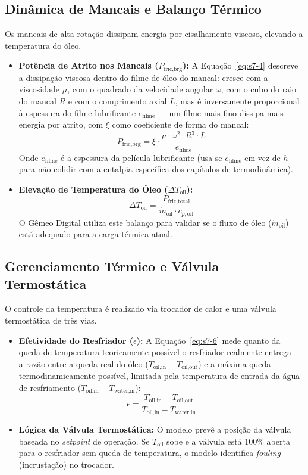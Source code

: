 \documentclass[12pt,a4paper]{article}
\numberwithin{equation}{section}
\numberwithin{table}{section}
\numberwithin{figure}{section}
\begin{document}
	\subsection{\textbf{Dinâmica de Mancais e Balanço Térmico}}
	Os mancais de alta rotação dissipam energia por cisalhamento viscoso, elevando a temperatura do óleo.
	\begin{itemize}
		\item \textbf{Potência de Atrito nos Mancais ($P_{\text{fric,brg}}$):} A Equação~\eqref{eq:s7-4} descreve a dissipação viscosa dentro do filme de óleo do mancal: cresce com a viscosidade $\mu$, com o quadrado da velocidade angular $\omega$, com o cubo do raio do mancal $R$ e com o comprimento axial $L$, mas é inversamente proporcional à espessura do filme lubrificante $e_{\text{filme}}$ — um filme mais fino dissipa mais energia por atrito, com $\xi$ como coeficiente de forma do mancal:
		\begin{equation}\label{eq:s7-4}
 P_{\text{fric,brg}} = \xi \cdot \frac{\mu \cdot \omega^2 \cdot R^3 \cdot L}{e_{\text{filme}}}
\end{equation}
		Onde $e_{\text{filme}}$ é a espessura da película lubrificante (usa-se $e_{\text{filme}}$ em vez de $h$ para não colidir com a entalpia específica dos capítulos de termodinâmica).
		\item \textbf{Elevação de Temperatura do Óleo ($\Delta T_{\text{oil}}$):}
		\begin{equation}\label{eq:s7-5}
 \Delta T_{\text{oil}} = \frac{P_{\text{fric,total}}}{\dot{m}_{\text{oil}} \cdot c_{p,\text{oil}}} 
\end{equation}
		O Gêmeo Digital utiliza este balanço para validar se o fluxo de óleo ($\dot{m}_{\text{oil}}$) está adequado para a carga térmica atual.
	\end{itemize}
	
	\subsection{\textbf{Gerenciamento Térmico e Válvula Termostática}}
	O controle da temperatura é realizado via trocador de calor e uma válvula termostática de três vias.
	\begin{itemize}
		\item \textbf{Efetividade do Resfriador ($\epsilon$):} A Equação~\eqref{eq:s7-6} mede quanto da queda de temperatura teoricamente possível o resfriador realmente entrega — a razão entre a queda real do óleo ($T_{\text{oil,in}} - T_{\text{oil,out}}$) e a máxima queda termodinamicamente possível, limitada pela temperatura de entrada da água de resfriamento ($T_{\text{oil,in}} - T_{\text{water,in}}$):
		\begin{equation}\label{eq:s7-6}
 \epsilon = \frac{T_{\text{oil,in}} - T_{\text{oil,out}}}{T_{\text{oil,in}} - T_{\text{water,in}}}
\end{equation}
		\item \textbf{Lógica da Válvula Termostática:} O modelo prevê a posição da válvula baseada no \textit{setpoint} de operação. Se $T_{\text{oil}}$ sobe e a válvula está 100\% aberta para o resfriador sem queda de temperatura, o modelo identifica \textit{fouling} (incrustação) no trocador.
	\end{itemize}
	
\end{document}
